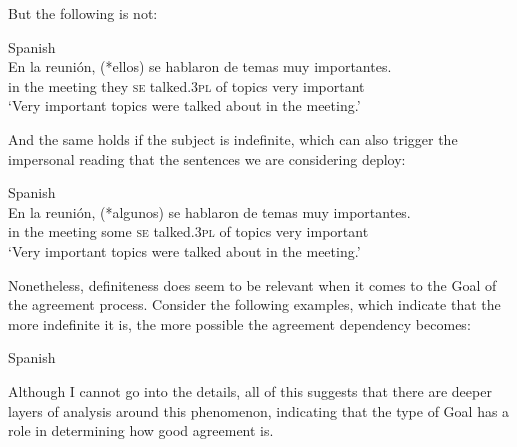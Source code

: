\documentclass[output=paper]{langsci/langscibook}
\begin{document}
But the following is not:

\ea%
    Spanish\label{ex:gallego:40}\\
    \gll En la   reunión, (*ellos)  se   hablaron     de  temas muy importantes.  \\
         in  the  meeting   they   \textsc{se} talked.\textsc{3pl}  of  topics very important\\
    \glt ‘Very important topics were talked about in the meeting.’
    \z

And the same holds if the subject is indefinite, which can also trigger the impersonal reading that the sentences we are considering deploy:

\ea%
    Spanish\label{ex:gallego:41}\\
    \gll En la    reunión, (*algunos) se hablaron   de  temas  muy importantes.\\
         in   the meeting  some     \textsc{se} talked.\textsc{3pl}   of  topics  very important\\
    \glt ‘Very important topics were talked about in the meeting.’
    \z

Nonetheless, definiteness does seem to be relevant when it comes to the Goal of the agreement process. Consider the following examples, which indicate that the more indefinite it is, the more possible the agreement dependency becomes:



\ea%
Spanish
    \label{ex:gallego:42}\\
    \z
\z    

Although I cannot go into the details, all of this suggests that there are deeper layers of analysis around this phenomenon, indicating that the type of Goal has a role in determining how good agreement is.
\end{document}

